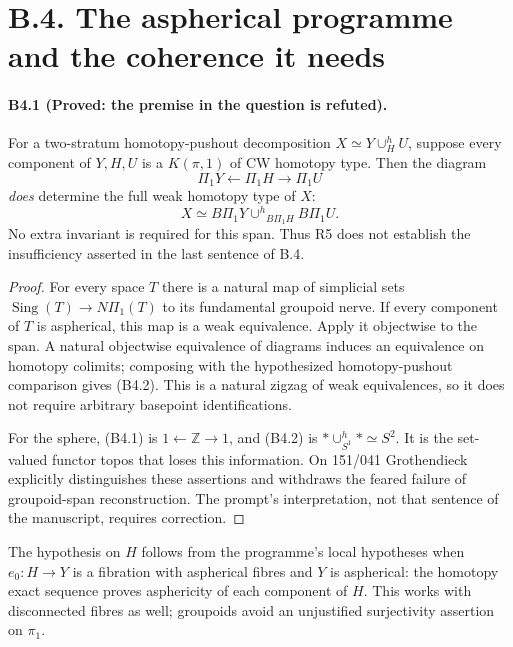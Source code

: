 \section{B.4. The aspherical programme and the coherence it needs}

\paragraph{B4.1 (Proved: the premise in the question is refuted).}
For a two-stratum homotopy-pushout decomposition
$X\simeq Y\cup^h_H U$, suppose every component of $Y,H,U$ is a
$K(\pi,1)$ of CW homotopy type. Then the diagram
\[
 \Pi_1Y\longleftarrow\Pi_1H\longrightarrow\Pi_1U
 \tag{B4.1}
\]
\emph{does} determine the full weak homotopy type of $X$:
\[
 X\simeq B\Pi_1Y\mathbin{\cup^h}_{B\Pi_1H}B\Pi_1U.
 \tag{B4.2}
\]
No extra invariant is required for this span. Thus R5 does not
establish the insufficiency asserted in the last sentence of B.4.

\begin{proof}
For every space $T$ there is a natural map of simplicial sets
$\operatorname{Sing}(T)\to N\Pi_1(T)$ to its fundamental groupoid
nerve. If every component of $T$ is aspherical, this map is a weak
equivalence. Apply it objectwise to the span. A natural objectwise
equivalence of diagrams induces an equivalence on homotopy
colimits; composing with the hypothesized homotopy-pushout
comparison gives (B4.2). This is a natural zigzag of weak
equivalences, so it does not require arbitrary basepoint identifications.

For the sphere, (B4.1) is $1\leftarrow\mathbb Z\to1$, and (B4.2)
is $*\cup^h_{S^1}*\simeq S^2$. It is the set-valued functor topos
that loses this information. On 151/041 Grothendieck explicitly
distinguishes these assertions and withdraws the feared failure of
groupoid-span reconstruction. The prompt's interpretation, not
that sentence of the manuscript, requires correction.
\end{proof}

The hypothesis on $H$ follows from the programme's local hypotheses
when $e_0:H\to Y$ is a fibration with aspherical fibres and $Y$ is
aspherical: the homotopy exact sequence proves asphericity of each
component of $H$. This works with disconnected fibres as well;
groupoids avoid an unjustified surjectivity assertion on $\pi_1$.

